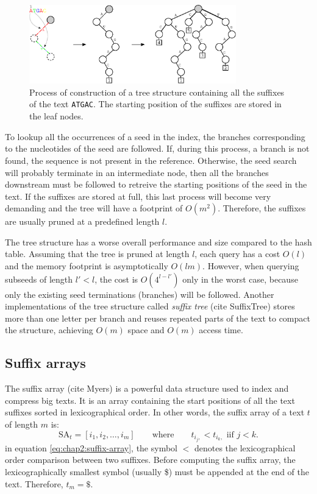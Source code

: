 \begin{figure}[h]
	\begin{minipage}[b]{\linewidth}
	  \centering
	  \includegraphics*[width=0.8\textwidth]{figures/chap2_suffix_tree}
	  \caption{Process of construction of a tree structure containing
       all the suffixes of the text \texttt{ATGAC}. The starting
       position of the suffixes are stored in the leaf nodes.}
	  \label{fig:chap2:tree}
   \end{minipage}
\end{figure}

To lookup all the occurrences of a seed in the index, the branches
corresponding to the nucleotides of the seed are followed. If, during
this process, a branch is not found, the sequence is not present in
the reference. Otherwise, the seed search will probably terminate in
an intermediate node, then all the branches downstream must be
followed to retreive the starting positions of the seed in the
text. If the suffixes are stored at full, this last process will
become very demanding and the tree will have a footprint of
$O(m^2)$. Therefore, the suffixes are usually pruned at a predefined
length $l$. 

The tree structure has a worse overall performance and size compared to
the hash table. Assuming that the tree is pruned at length $l$, each
query has a cost $O(l)$ and the memory footprint is asymptotically
$O(lm)$. However, when querying subseeds of length $l'<l$, the cost is
$O(4^{l-l'})$ only in the worst case, because only the existing seed
terminations (branches) will be followed. Another implementations of
the tree structure called {\em suffix tree} (cite SuffixTree) stores
more than one letter per branch and reuses repeated parts of the text
to compact the structure, achieving $O(m)$ space and $O(m)$ access
time.

\subsection{Suffix arrays}
\label{sec:chap2:seed-sa}
The suffix array (cite Myers) is a powerful data structure used to
index and compress big texts. It is an array containing the start
positions of all the text suffixes sorted in lexicographical order. In
other words, the suffix array of a text $t$ of length $m$ is:
\begin{equation} 
\label{eq:chap2:suffix-array}
\mbox{SA}_t = [i_1, i_2, \ldots, i_m] \qquad \mbox{where} \qquad t_{i_j,} < t_{i_k,}
\mbox{ iif } j<k. 
\end{equation}
in equation \eqref{eq:chap2:suffix-array}, the symbol $<$ denotes the
lexicographical order comparison between two suffixes. Before
computing the suffix array, the lexicographically smallest symbol
(usually \$) must be appended at the end of the text. Therefore, $t_m
= \$$.

